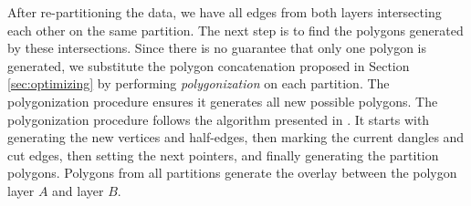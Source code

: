 After re-partitioning the data, we have all edges from both layers intersecting each other on the same partition. The next step is to find the polygons generated by these intersections. Since there is no guarantee that only one polygon is generated, we substitute the polygon concatenation proposed in Section \ref{sec:optimizing} by performing \textit{polygonization} on each partition. The polygonization procedure ensures it generates all new possible polygons. The polygonization procedure follows the algorithm presented in \cite{abdelhafeez_ddcel_2023} . It starts with generating the new vertices and half-edges, then marking the current dangles and cut edges, then setting the next pointers, and finally generating the partition polygons. Polygons from all partitions generate the overlay between the polygon layer $A$ and layer $B$.

